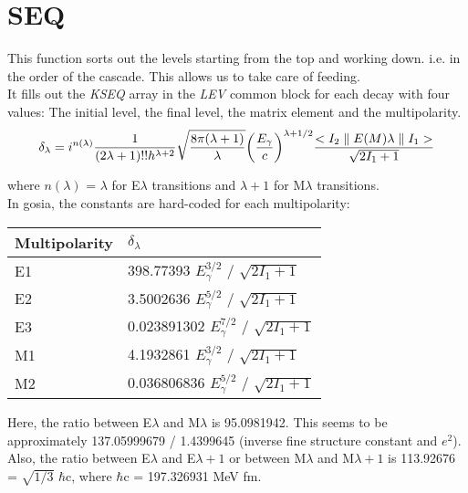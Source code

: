 \section{SEQ}
\label{sect:seq}

\noindent This function sorts out the levels starting from the top and
working down. i.e. in the order of the cascade. This allows us to take care
of feeding.\\

\noindent It fills out the {\em KSEQ} array in the {\em LEV} common block
for each decay with four values: The initial level, the final level, the
matrix element and the multipolarity.\\

\begin{equation}
\delta_\lambda =
i^{n(\lambda)}
{1 \over (2 \lambda + 1)!! h^{\lambda + 2}}
\sqrt{8 \pi (\lambda + 1) \over \lambda}
\bigg({E_\gamma \over c}\bigg)^{\lambda + 1/2}
{<I_2 \parallel E(M)\lambda \parallel I_1> \over \sqrt{2 I_1 + 1}}
\end{equation}

\noindent where $n(\lambda)$ = $\lambda$ for E$\lambda$ transitions and
$\lambda + 1$ for M$\lambda$ transitions.\\

\noindent In gosia, the constants are hard-coded for each multipolarity:\\

\begin{center}
\begin{tabular}{|ll|}
\hline
Multipolarity & $\delta_\lambda$\\
\hline
E1 & 398.77393 $E_\gamma^{3/2}$ / $\sqrt{2 I_1 + 1}$\\
E2 & 3.5002636 $E_\gamma^{5/2}$ / $\sqrt{2 I_1 + 1}$\\
E3 & 0.023891302 $E_\gamma^{7/2}$ / $\sqrt{2 I_1 + 1}$\\
M1 & 4.1932861 $E_\gamma^{3/2}$ / $\sqrt{2 I_1 + 1}$\\
M2 & 0.036806836 $E_\gamma^{5/2}$ / $\sqrt{2 I_1 + 1}$\\
\hline
\end{tabular}
\end{center}

\noindent Here, the ratio between E$\lambda$ and M$\lambda$ is 95.0981942.
This seems to be approximately 137.05999679 / 1.4399645 (inverse fine
structure constant and $e^2$).\\


\noindent Also, the ratio between E$\lambda$ and E$\lambda+1$ or between
M$\lambda$ and M$\lambda+1$ is 113.92676 = $\sqrt{1/3}$ $\hbar$c, where
$\hbar$c = 197.326931 MeV fm.\\

